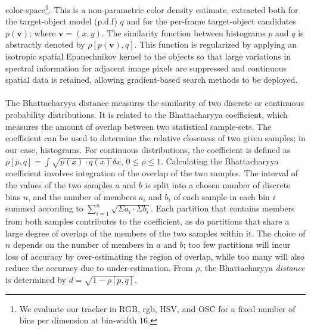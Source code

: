 \documentclass[a4paper,11pt]{article}
\newcommand{\tbf}{\textbf}
\begin{document}
		color-space\footnote{We evaluate our tracker in RGB, rgb, HSV, and OSC for a
		fixed number of bins per dimension at bin-width $16$.}. This is a non-parametric
		color density estimate, extracted both for the target-object model (p.d.f) $q$
		and for the per-frame target-object candidates $p(\tbf{v})$; where $\tbf{v} = (x, y)$.
		The similarity function between histograms $p$ and $q$ is abstractly denoted by
		$\rho[p(\tbf{v}), q]$. This function is regularized by applying an isotropic spatial
		Epanechnikov kernel to the objects so that large variations in spectral information
		for adjacent image pixels are suppressed and continuous spatial data is retained,
		allowing gradient-based search methods to be deployed.
		\\ \\
		The Bhattacharyya distance measures the similarity of two discrete or continuous
		probability distributions. It is related to the Bhattacharyya coefficient, which
		measures the amount of overlap between two statistical sample-sets. The coefficient
		can be used to determine the relative closeness of two given samples; in our case,
		histograms. For continuous distributions, the coefficient is defined as
		$\rho[p, q] = \int \sqrt{p(x) \cdot q(x) } \delta x$, $0 \leq \rho \leq 1$.
		Calculating the Bhattacharyya coefficient involves integration of the overlap
		of the two samples. The interval of the values of the two samples $a$ and $b$
		is split into a chosen number of discrete bins $n$, and the number of members
		$a_i$ and $b_i$ of each sample in each bin $i$ summed according to
		$\sum_{i=1}^{n} \sqrt{\Sigma a_i \cdot \Sigma b_i}$. Each partition that contains
		members from both samples contributes to the coefficient, as do partitions that
		share a large degree of overlap of the members of the two samples  within it. The
		choice of $n$ depends on the number of members in $a$ and $b$; too few partitions
		will incur loss of accuracy by over-estimating the region of overlap, while too many
		will also reduce the accuracy due to under-estimation. From $\rho$, the Bhattacharyya
		\textit{distance} is determined by $d = \sqrt{1 - \rho[p, q]}$.
\end{document}
